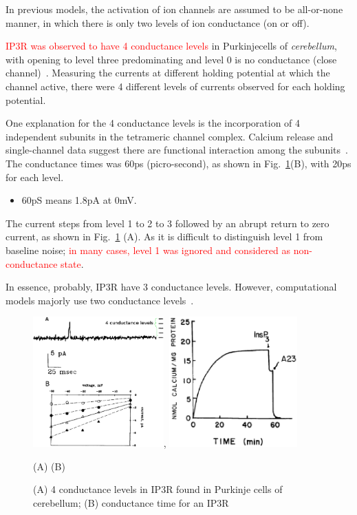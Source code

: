 In previous models, the activation of ion channels are assumed to be all-or-none
manner, in which there is only two levels of ion conductance (on or off).

\textcolor{red}{IP3R was observed to have 4 conductance levels} in
Purkinjecells of {\it cerebellum}, with opening to level three
predominating and level 0 is no conductance (close
channel)~\cite{watras1991ip3r}. Measuring the currents at different
holding potential at which the channel active, there were 4 different
levels of currents observed for each holding potential.  

One explanation for the 4 conductance levels is the incorporation of 4
independent subunits in the tetrameric channel complex. Calcium
release and single-channel data suggest there are functional
interaction among the subunits~\cite{watras1991ip3r}.  The conductance
times was 60ps (picro-second), as shown in
Fig.~\ref{fig:IP3R_4conductance}(B), with 20ps for each level. 
\begin{itemize}
  \item 60pS means 1.8pA at 0mV. 
\end{itemize}

The current steps from level 1 to 2 to 3 followed by an abrupt return to zero
current, as shown in Fig.~\ref{fig:IP3R_4conductance} (A). As it is
difficult to distinguish level 1 from baseline noise;
\textcolor{red}{in many cases, level 1 was ignored and considered as
non-conductance state}.

In essence, probably, IP3R have 3 conductance levels. However,
computational models majorly use two conductance
levels~\cite{deyoung1992spip3}.

\begin{figure}[hbt]
 \centerline{\includegraphics[height=5cm]{./images/IP3R_4cond.eps}, \includegraphics[height=5cm]{./images/IP3R_cond_time.eps}}
\centerline{         (A)   \hspace{20mm}   (B)    }
\caption{(A) 4 conductance levels in IP3R found in Purkinje cells of
  cerebellum; (B) conductance time for an IP3R}
\label{fig:IP3R_4conductance}
\end{figure}

